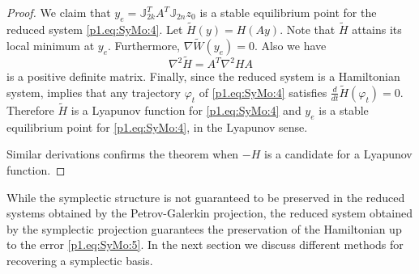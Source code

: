 {\begin{proof}
We claim that $y_e = \mathbb J_{2k}^T A^T \mathbb J_{2n} z_0$ is a stable equilibrium point for the reduced system \eqref{p1.eq:SyMo:4}. Let $\tilde H(y) = H(Ay)$. Note that $\tilde H$ attains its local minimum at $y_e$. Furthermore, $\nabla \tilde W(y_e) = 0$. Also we have
\begin{equation}
	\nabla^2 \tilde H = A^T \nabla^2 H A
\end{equation}
is a positive definite matrix. Finally, since the reduced system is a Hamiltonian system,  implies that any trajectory $\varphi_t$ of \eqref{p1.eq:SyMo:4} satisfies $\frac{d}{dt} \tilde H(\varphi_t) = 0$. Therefore $\tilde H$ is a Lyapunov function for \eqref{p1.eq:SyMo:4} and $y_e$ is a stable equilibrium point for \eqref{p1.eq:SyMo:4}, in the Lyapunov sense.

Similar derivations confirms the theorem when $-H$ is a candidate for a Lyapunov function.
\end{proof}
}



While the symplectic structure is not guaranteed to be preserved in the reduced systems obtained by the Petrov-Galerkin projection, the reduced system obtained by the symplectic projection guarantees the preservation of the Hamiltonian up to the error \eqref{p1.eq:SyMo:5}. In the next section we discuss  different methods for recovering a symplectic basis.

